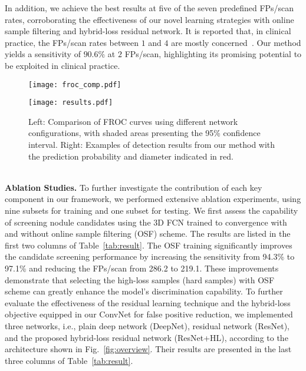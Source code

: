 \documentclass{llncs}
\begin{document}
In addition, we achieve the best results at five of the seven predefined FPs/scan rates, corroborating the effectiveness of our novel learning strategies with online sample filtering and hybrid-loss residual network. 
It is reported that, in clinical practice, the FPs/scan rates between $1$ and $4$ are mostly concerned~\cite{van2010comparing}.
Our method yields a sensitivity of $90.6\%$ at $2$ FPs/scan, highlighting its promising potential to be exploited in clinical practice.
\\
\begin{figure}[t]
\centering
	\begin{minipage}[t]{0.49\textwidth}
	\texttt{[image: froc\_comp.pdf]}
	\end{minipage}
	\begin{minipage}[t]{0.49\textwidth}
	\texttt{[image: results.pdf]}
	\end{minipage}
\vspace{-2mm}
\caption{Left: Comparison of FROC curves using different network configurations, with shaded areas presenting the 95\% confidence interval. Right: Examples of detection results from our method with the prediction probability and diameter indicated in red.}
\label{fig:comp}
\end{figure}
\\
\textbf{Ablation Studies.}
To further investigate the contribution of each key component in our framework, we performed extensive ablation experiments, using nine subsets for training and one subset for testing.
We first assess the capability of screening nodule candidates using the 3D FCN trained to convergence with and without online sample filtering (OSF) scheme.
The results are listed in the first two columns of Table~\ref{tab:result}.
The OSF training significantly improves the candidate screening performance by increasing the sensitivity from 94.3\% to 97.1\% and reducing the FPs/scan from 286.2 to 219.1.
These improvements demonstrate that selecting the high-loss samples (hard samples) with OSF scheme can greatly enhance the model's discrimination capability.
To further evaluate the effectiveness of the residual learning technique and the hybrid-loss objective equipped in our ConvNet for false positive reduction, we implemented three networks, i.e., plain deep network (DeepNet), residual network (ResNet), and the proposed hybrid-loss residual network (ResNet+HL), according to the architecture shown in Fig.~\ref{fig:overview}.
Their results are presented in the last three columns of Table~\ref{tab:result}.
\end{document}
